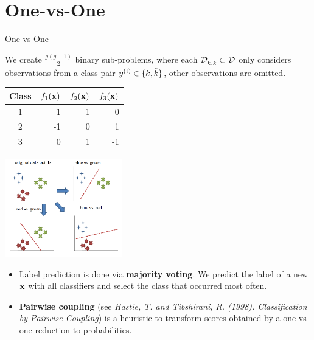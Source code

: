 \section{One-vs-One}

\begin{vbframe}{One-vs-One}

    We create $\frac{g(g - 1)}{2}$ binary sub-problems, where each $\mathcal{D}_{k, \tilde k} \subset \mathcal{D}$ only considers observations from a class-pair $y^{(i)} \in \{k, \tilde k\}$, other observations are omitted.

    \begin{table}[]
    \begin{tabular}{|c|r|r|r|} \hline
    \textbf{Class}  & \textbf{$f_1{(\mathbf{x})}$} & \textbf{$f_2{(\mathbf{x})}$}  & \textbf{$f_3{(\mathbf{x})}$} \\ \hline
    \textbf{$1$}  &   1                 & -1                   & 0                  \\ \hline
    \textbf{$2$}  &  -1                 &  0                   & 1                   \\ \hline
    \textbf{$3$}  & 0                  &  1                   &  -1                   \\ \hline
    \end{tabular}
    \end{table}


    \begin{center}
    \includegraphics[width=0.38\textwidth]{figure_man/one_vs_one.png}
    \end{center}

    \framebreak 

  \begin{itemize}
    \item Label prediction is done via \textbf{majority voting}. We predict the label of a new $\mathbf{x}$ with all classifiers and select the class that occurred most often. 

    \item \textbf{Pairwise coupling} (see \emph{Hastie, T. and Tibshirani, R. (1998). Classification by Pairwise Coupling}) is a heuristic to transform scores obtained by a one-vs-one reduction to probabilities. 

  \end{itemize}
  \end{vbframe}

